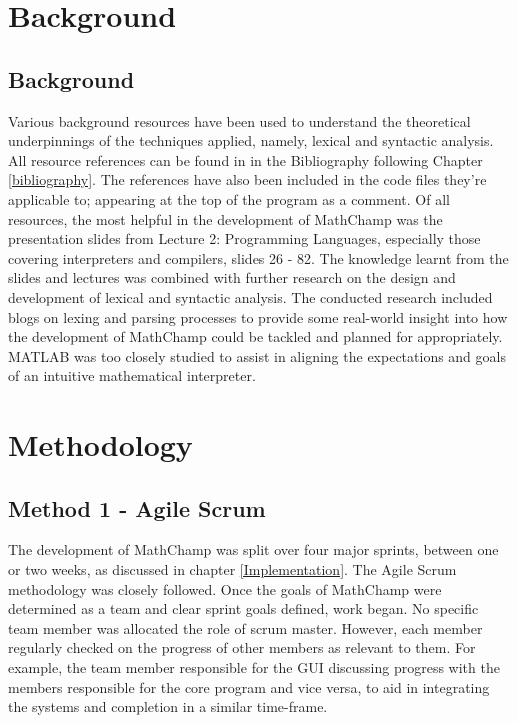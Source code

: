 \documentclass[a4paper, oneside, 11pt]{report}
\begin{document}
\chapter{Background}\label{background}

\section{Background}
Various background resources have been used to understand the theoretical underpinnings of the techniques applied, namely, lexical and syntactic analysis. All resource references can be found in in the Bibliography following Chapter \ref{bibliography}. The references have also been included in the code files they're applicable to; appearing at the top of the program as a comment. Of all resources, the most helpful in the development of MathChamp was the presentation slides from Lecture 2: Programming Languages, especially those covering interpreters and compilers, slides 26 - 82. The knowledge learnt from the slides and lectures was combined with further research on the design and development of lexical and syntactic analysis. The conducted research included blogs on lexing and parsing processes to provide some real-world insight into how the development of MathChamp could be tackled and planned for appropriately. MATLAB was too closely studied to assist in aligning the expectations and goals of an intuitive mathematical interpreter.


\chapter{Methodology}\label{Methodology}

\section{Method 1 - Agile Scrum}
The development of MathChamp was split over four major sprints, between one or two weeks, as discussed in chapter \ref{Implementation}. The Agile Scrum methodology was closely followed. Once the goals of MathChamp were determined as a team and clear sprint goals defined, work began. No specific team member was allocated the role of scrum master. However, each member regularly checked on the progress of other members as relevant to them. For example, the team member responsible for the GUI discussing progress with the members responsible for the core program and vice versa, to aid in integrating the systems and completion in a similar time-frame.
\end{document}

